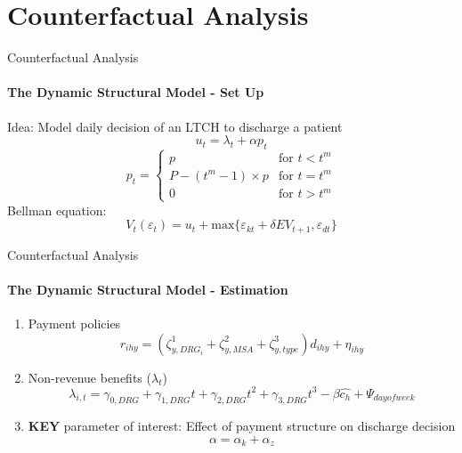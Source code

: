 \documentclass{beamer}
\begin{document}
\section{Counterfactual Analysis}
\begin{frame}{Counterfactual Analysis}
\framesubtitle{The Dynamic Structural Model - Set Up}
Idea: Model daily decision of an LTCH to discharge a patient\\

\begin{equation}
u_t = \lambda_t + \alpha p_t
\end{equation}
\begin{equation*}
p_t = \begin{cases}
p&\text{for $t < t^m$}\\
P - (t^m - 1) \times p &\text{for $t = t^m$} \\
0 &\text{for $t > t^m$}
\end{cases}
\end{equation*}
Bellman equation:
\begin{equation}
V_t(\varepsilon_t) = u_t + \text{max\{$\varepsilon_{kt} + \delta EV_{t+1}, \varepsilon_{dt} $\}}
\end{equation}
\end{frame}

\begin{frame}{Counterfactual Analysis}
\framesubtitle{The Dynamic Structural Model - Estimation }
\begin{enumerate}
	\item Payment policies
			\begin{equation}
			r_{ihy} = (\zeta_{y, DRG_i}^{1}+\zeta_{y, MSA}^{2}+\zeta_{y, type}^{3})d_{ihy} + \eta_{ihy}
			\end{equation}
	\item Non-revenue benefits ($\lambda_t$)
			\begin{equation}
		\lambda_{i,t} = \gamma_{0, DRG} + \gamma_{1, DRG}t+ \gamma_{2, DRG}t^2+ \gamma_{3, DRG}t^3 - \beta \hat{c_h} + \Psi_{day of week}
			\end{equation}
	\item \textbf{KEY} parameter of interest: Effect of payment structure on discharge decision
			\begin{equation}
			\alpha = \alpha_k + \alpha_z
			\end{equation}
\end{enumerate}
\end{frame}
\end{document}

